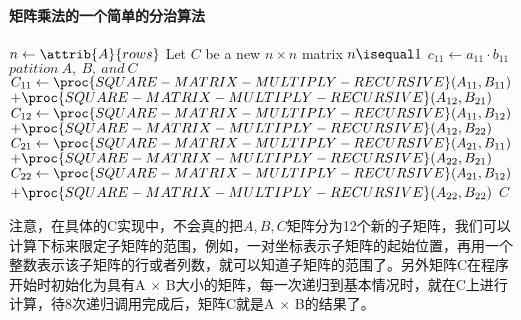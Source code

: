 \documentclass[a4paper,11pt]{article}
\begin{document}
\paragraph*{矩阵乘法的一个简单的分治算法}
\begin{codebox}
	\li $n \gets \attrib{A}{rows}$
	\li Let $C$ be a new $n \times n$ matrix
	\li \If $n \isequal 1$
	\li		\Then $c_{11} \gets a_{11} \cdot b_{11}$
	\li		\Else $patition\ A,\ B,\ and \ C$
	\li			$C_{11} \gets \proc{SQUARE-MATRIX-MULTIPLY-RECURSIVE}(A_{11},B_{11})$\\
	\>\>$+\proc{SQUARE-MATRIX-MULTIPLY-RECURSIVE}(A_{12},B_{21})$
	\li			$C_{12} \gets \proc{SQUARE-MATRIX-MULTIPLY-RECURSIVE}(A_{11},B_{12})$\\
	\>\>$+\proc{SQUARE-MATRIX-MULTIPLY-RECURSIVE}(A_{12},B_{22})$
	\li			$C_{21} \gets	\proc{SQUARE-MATRIX-MULTIPLY-RECURSIVE}(A_{21},B_{11})$\\
	\>\>$+\proc{SQUARE-MATRIX-MULTIPLY-RECURSIVE}(A_{22},B_{21})$
	\li			$C_{22} \gets \proc{SQUARE-MATRIX-MULTIPLY-RECURSIVE}(A_{21},B_{12})$\\
	\>\>$+\proc{SQUARE-MATRIX-MULTIPLY-RECURSIVE}(A_{22},B_{22})$
				\End
	\li	\Return $C$
\end{codebox}
注意，在具体的C实现中，不会真的把$A,B,C$矩阵分为12个新的子矩阵，我们可以计算下标来限定子矩阵的范围，例如，一对坐标表示子矩阵的起始位置，再用一个整数表示该子矩阵的行或者列数，就可以知道子矩阵的范围了。另外矩阵C在程序开始时初始化为具有A $\times$ B大小的矩阵，每一次递归到基本情况时，就在C上进行计算，待8次递归调用完成后，矩阵C就是A $\times$ B的结果了。
\end{document}
